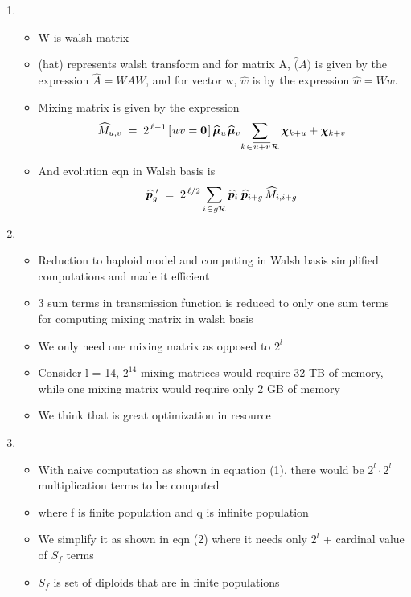\documentclass{article}
\newcommand{\nudge}{\hspace{0.01in}}
\begin{document}
\begin{enumerate}
\item
  \begin{itemize}
  \item W is walsh matrix
  \item (hat) represents walsh transform and for matrix A, $\hat(A)$
    is given by the expression $\widehat{A} = WAW$, and for vector w, $\hat{w}$ is 
    by the expression $\widehat{w} = Ww$.
  \item Mixing matrix is given by the expression
    \[
	  \widehat{M}_{u,v} \; = \; 2^{\,\ell-1} \,[\nudge u \nudge v = {\bf
	  0}\nudge]\, \widehat{\bm{\mu}}_u \nudge \widehat{\bm{\mu}}_v \!  \sum_{k
	\nudge \in \nudge \overline{u+v} \nudge \mathcal{R}} \bm{\chi}_{k + u} +
	\bm{\chi}_{k + v}
	\]
  \item And evolution eqn in Walsh basis is 
  \[
	  \widehat{\bm{p}}_g^{\,\,\prime} \; = \; 2^{\,\ell/2} \sum_{i \nudge \in \nudge g \mathcal{R}}
	  \widehat{\bm{p}}_i \, \nudge \widehat{\bm{p}}_{i+g} \,\widehat{M}_{i,i+g}
	\]
  \end{itemize}
    
\item
  \begin{itemize}
  \item Reduction to haploid model and computing in Walsh basis
    simplified computations and made it efficient
  \item 3 sum terms in transmission function is reduced to only one sum terms for computing mixing matrix in walsh basis 
  \item We only need one mixing matrix as opposed to $2^l$
  \item Consider l = 14, $2^14$ mixing matrices would require 32 TB of
    memory, while one mixing matrix would require only 2 GB of memory
  \item We think that is great optimization in resource
  \end{itemize}
    
\item
  \begin{itemize}
  \item With naive computation as shown in equation (1), there would
    be $2^l \cdot 2^l$ multiplication terms to be computed
  \item where f is finite population and q is infinite population
  \item We simplify it as shown in eqn (2) where it needs only $2^l$ +
    cardinal value of $S_f$ terms
  \item $S_f$ is set of diploids that are in finite populations
  \end{itemize}
  

\end{enumerate}
\end{document}

